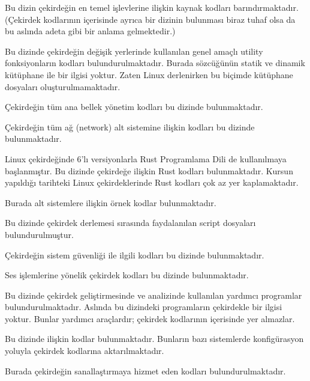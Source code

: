 \documentclass[a4paper,10pt,turkish]{sphinxmanual}
\begin{document}
\begin{description}
\sphinxAtStartPar
Bu dizin çekirdeğin en temel işlevlerine ilişkin kaynak kodları barındırmaktadır.
(Çekirdek kodlarının içerisinde ayrıca bir  dizinin bulunması biraz tuhaf olsa
da bu aslında adeta  gibi bir anlama gelmektedir.)

\sphinxAtStartPar
Bu dizinde çekirdeğin değişik yerlerinde kullanılan genel amaçlı utility fonksiyonların
kodları bulundurulmaktadır. Burada  sözcüğünün statik ve dinamik kütüphane ile bir
ilgisi yoktur. Zaten Linux derlenirken bu biçimde kütüphane dosyaları
oluşturulmamaktadır.

\sphinxAtStartPar
Çekirdeğin tüm ana bellek yönetim kodları bu dizinde bulunmaktadır.

\sphinxAtStartPar
Çekirdeğin tüm ağ (network) alt sistemine ilişkin kodları bu dizinde bulunmaktadır.

\sphinxAtStartPar
Linux çekirdeğinde 6’lı versiyonlarla Rust Programlama Dili de kullanılmaya başlanmıştır.
Bu dizinde çekirdeğe ilişkin Rust kodları bulunmaktadır. Kursun yapıldığı tarihteki
Linux çekirdeklerinde Rust kodları çok az yer kaplamaktadır.

\sphinxAtStartPar
Burada alt sistemlere ilişkin örnek kodlar bulunmaktadır.

\sphinxAtStartPar
Bu dizinde çekirdek derlemesi sırasında faydalanılan script dosyaları
bulundurulmuştur.

\sphinxAtStartPar
Çekirdeğin sistem güvenliği ile ilgili kodları bu dizinde bulunmaktadır.

\sphinxAtStartPar
Ses işlemlerine yönelik çekirdek kodları bu dizinde bulunmaktadır.

\sphinxAtStartPar
Bu dizinde çekirdek geliştirmesinde ve analizinde kullanılan yardımcı programlar
bulundurulmaktadır. Aslında bu dizindeki programların çekirdekle bir ilgisi yoktur.
Bunlar yardımcı araçlardır; çekirdek kodlarının içerisinde yer almazlar.

\sphinxAtStartPar
Bu dizinde  ilişkin kodlar
bulunmaktadır. Bunların bazı sistemlerde konfigürasyon yoluyla çekirdek kodlarına
aktarılmaktadır.

\sphinxAtStartPar
Burada çekirdeğin sanallaştırmaya hizmet eden kodları bulundurulmaktadır.

\end{description}
\end{document}
